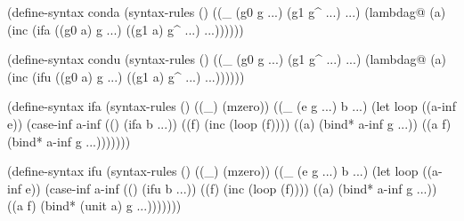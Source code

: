 \schemedisplayspace
\begin{schemedisplay}
(define-syntax conda
  (syntax-rules ()
    ((_ (g0 g ...) (g1 g^ ...) ...)
     (lambdag@ (a)
       (inc
         (ifa ((g0 a) g ...)
              ((g1 a) g^ ...) ...))))))

(define-syntax condu
  (syntax-rules ()
    ((_ (g0 g ...) (g1 g^ ...) ...)
     (lambdag@ (a)
       (inc
         (ifu ((g0 a) g ...)
              ((g1 a) g^ ...) ...))))))

(define-syntax ifa
  (syntax-rules ()
    ((_) (mzero))
    ((_ (e g ...) b ...)
     (let loop ((a-inf e))
       (case-inf a-inf
         (() (ifa b ...))
         ((f) (inc (loop (f))))
         ((a) (bind* a-inf g ...))
         ((a f) (bind* a-inf g ...)))))))
\end{schemedisplay}
\newpage
\begin{schemedisplay}  
(define-syntax ifu
  (syntax-rules ()
    ((_) (mzero))
    ((_ (e g ...) b ...)
     (let loop ((a-inf e))
       (case-inf a-inf
         (() (ifu b ...))
         ((f) (inc (loop (f))))
         ((a) (bind* a-inf g ...))
         ((a f) (bind* (unit a) g ...)))))))
\end{schemedisplay}








